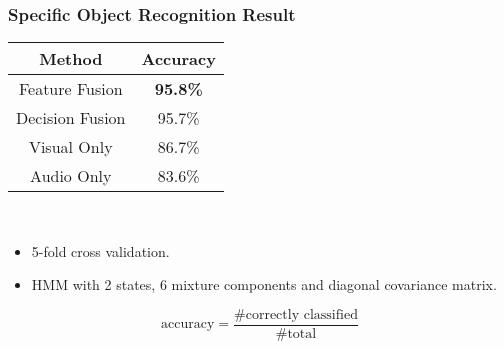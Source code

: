 \documentclass{beamer}
\begin{document}
\begin{frame}
  \frametitle{Specific Object Recognition Result}

  \centering
  \begin{tabular}[h]{c|c}
    \hline
    Method & Accuracy \\ \hline \hline
    Feature Fusion & \textbf{95.8\%} \\ \hline
    Decision Fusion  & 95.7\% \\ \hline
    Visual Only & 86.7\% \\ \hline
    Audio Only & 83.6\% \\ \hline
  \end{tabular}

  ~
  \begin{itemize}
    \item 5-fold cross validation.
    \item HMM with 2 states, 6 mixture components and diagonal covariance matrix.
  \end{itemize}
  \vfill
  {\scriptsize
    \[ \text{accuracy} =  \frac{\text{\# correctly classified}}{\text{\# total}} \]
  }
\end{frame}

\iffalse
\begin{frame}
  \frametitle{Generic Category Recognition Result}

  \begin{columns}
    \begin{column}{.5\linewidth}
      \centering
      \scriptsize
      \texttt{[image: roc.tikz]}
    \end{column}
    \begin{column}{.5\linewidth}
      \begin{itemize}
        \item Object-based cross validation.
        \item Receiver operating characteristic (ROC).
        \item Area under the curve (AUC).
          \begin{itemize}
            \item 0.5 => Random
            \item 1.0 => Perfect 
          \end{itemize}
      \end{itemize}
    \end{column}
  \end{columns}
  {\scriptsize
    \[ \text{true positive rate} =  \frac{\text{\# true positive}}{\text{\# conditional positive}} \]
    \[ \text{false positive rate} =  \frac{\text{\# false positive}}{\text{\# conditional negative}} \]
  }
\end{frame}
\fi
\end{document}
